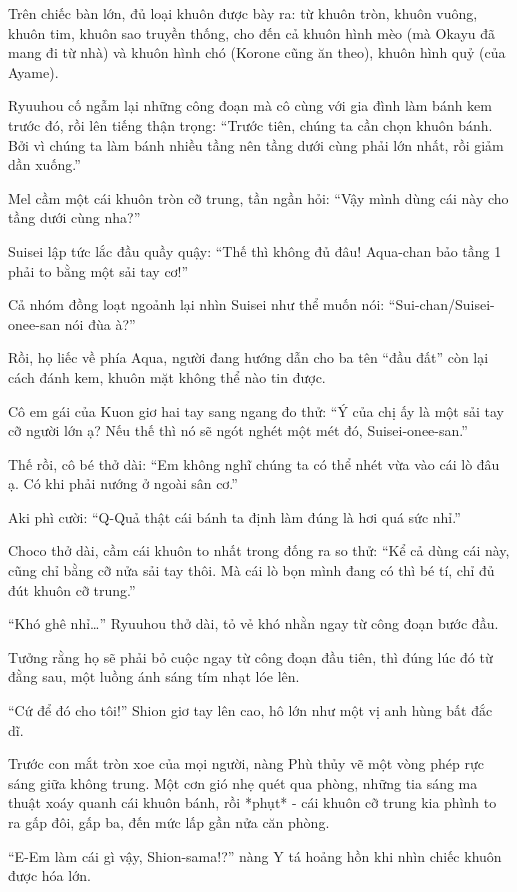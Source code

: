 \documentclass[../main.tex]{subfiles}
\begin{document}
Trên chiếc bàn lớn, đủ loại khuôn được bày ra: từ khuôn tròn, khuôn vuông, khuôn tim, khuôn sao truyền thống, cho đến cả khuôn hình mèo (mà Okayu đã mang đi từ nhà) và khuôn hình chó (Korone cũng ăn theo), khuôn hình quỷ (của Ayame).

Ryuuhou cố ngẫm lại những công đoạn mà cô cùng với gia đình làm bánh kem trước đó, rồi lên tiếng thận trọng: ``Trước tiên, chúng ta cần chọn khuôn bánh. Bởi vì chúng ta làm bánh nhiều tầng nên tầng dưới cùng phải lớn nhất, rồi giảm dần xuống.''

Mel cầm một cái khuôn tròn cỡ trung, tần ngần hỏi: ``Vậy mình dùng cái này cho tầng dưới cùng nha?''

Suisei lập tức lắc đầu quầy quậy: ``Thế thì không đủ đâu! Aqua-chan bảo tầng 1 phải to bằng một sải tay cơ!''

Cả nhóm đồng loạt ngoảnh lại nhìn Suisei như thể muốn nói: ``Sui-chan/Suisei-onee-san nói đùa à?''

Rồi, họ liếc về phía Aqua, người đang hướng dẫn cho ba tên ``đầu đất'' còn lại cách đánh kem, khuôn mặt không thể nào tin được.

Cô em gái của Kuon giơ hai tay sang ngang đo thử: ``Ý của chị ấy là một sải tay cỡ người lớn ạ? Nếu thế thì nó sẽ ngót nghét một mét đó, Suisei-onee-san.''

Thế rồi, cô bé thở dài: ``Em không nghĩ chúng ta có thể nhét vừa vào cái lò đâu ạ. Có khi phải nướng ở ngoài sân cơ.''

Aki phì cười: ``Q-Quả thật cái bánh ta định làm đúng là hơi quá sức nhỉ.''

Choco thở dài, cầm cái khuôn to nhất trong đống ra so thử: ``Kể cả dùng cái này, cũng chỉ bằng cỡ nửa sải tay thôi. Mà cái lò bọn mình đang có thì bé tí, chỉ đủ đút khuôn cỡ trung.''

``Khó ghê nhỉ\dots'' Ryuuhou thở dài, tỏ vẻ khó nhằn ngay từ công đoạn bước đầu.

Tưởng rằng họ sẽ phải bỏ cuộc ngay từ công đoạn đầu tiên, thì đúng lúc đó từ đằng sau, một luồng ánh sáng tím nhạt lóe lên.

``Cứ để đó cho tôi!'' Shion giơ tay lên cao, hô lớn như một vị anh hùng bất đắc dĩ.

Trước con mắt tròn xoe của mọi người, nàng Phù thủy vẽ một vòng phép rực sáng giữa không trung. Một cơn gió nhẹ quét qua phòng, những tia sáng ma thuật xoáy quanh cái khuôn bánh, rồi *phụt* - cái khuôn cỡ trung kia phình to ra gấp đôi, gấp ba, đến mức lấp gần nửa căn phòng.

``E-Em làm cái gì vậy, Shion-sama!?'' nàng Y tá hoảng hồn khi nhìn chiếc khuôn được hóa lớn.
\end{document}
